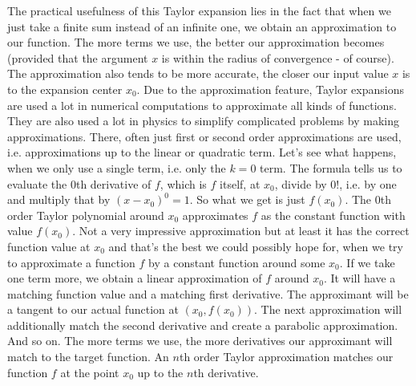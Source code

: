 





\medskip
The practical usefulness of this Taylor expansion lies in the fact that when we just take a finite sum instead of an infinite one, we obtain an approximation to our function. The more terms we use, the better our approximation becomes (provided that the argument $x$ is within the radius of convergence - of course). The approximation also tends to be more accurate, the closer our input value $x$ is to the expansion center $x_0$. Due to the approximation feature, Taylor expansions are used a lot in numerical computations to approximate all kinds of functions. They are also used a lot in physics to simplify complicated problems by making approximations. There, often just first or second order approximations are used, i.e. approximations up to the linear or quadratic term. Let's see what happens, when we only use a single term, i.e. only the $k=0$ term. The formula tells us to evaluate the $0$th derivative of $f$, which is $f$ itself, at $x_0$, divide by $0!$, i.e. by one and multiply that by $(x-x_0)^0 = 1$. So what we get is just $f(x_0)$. The $0$th order Taylor polynomial around $x_0$ approximates $f$ as the constant function with value $f(x_0)$. Not a very impressive approximation but at least it has the correct function value at $x_0$ and that's the best we could possibly hope for, when we try to approximate a function $f$ by a constant function around some $x_0$. If we take one term more, we obtain a linear approximation of $f$ around $x_0$. It will have a matching function value and a matching first derivative. The approximant will be a tangent to our actual function at $(x_0, f(x_0))$. The next approximation will additionally match the second derivative and create a parabolic approximation. And so on. The more terms we use, the more derivatives our approximant will match to the target function. An $n$th order Taylor approximation matches our function $f$ at the point $x_0$ up to the $n$th derivative.

